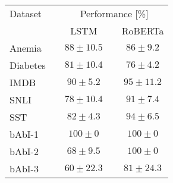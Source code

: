 \documentclass{standalone}
\begin{document}
\centering
\begin{tabular}{l c c c c}
    \toprule
    Dataset & & \multicolumn{3}{c}{Performance [\%]} \\
    \cmidrule(r){3-5}
    & & LSTM & & RoBERTa \\
    \midrule
    Anemia & & $88 \pm 10.5$ & & $86 \pm 9.2$ \\
    Diabetes & & $81 \pm 10.4$ & & $76 \pm 4.2$ \\
    IMDB  & & $90 \pm 5.2$ & & $95 \pm 11.2$ \\
    SNLI  & & $78 \pm 10.4$ & & $91 \pm 7.4$ \\
    SST & & $82 \pm 4.3$ & & $94 \pm 6.5$ \\
    bAbI-1 & & $100 \pm 0$ & & $100  \pm 0 $ \\
    bAbI-2 & & $68 \pm 9.5$ & & $100 \pm 0$ \\
    bAbI-3 & & $60 \pm 22.3$ & & $81 \pm 24.3$ \\
    \bottomrule
\end{tabular}
\endminipage
\end{document}
